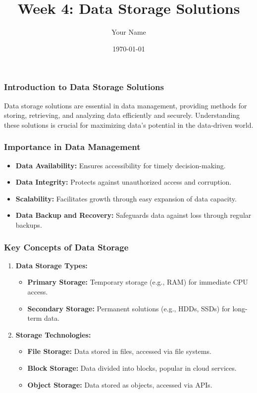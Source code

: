 \documentclass[aspectratio=169]{beamer}
\title[Week 4: Data Storage Solutions]{Week 4: Data Storage Solutions}
\author{Your Name}
\institute{Your Institution}
\date{\today}
\begin{document}
\frame{\titlepage}

\begin{frame}[fragile]
    \frametitle{Introduction to Data Storage Solutions}
    Data storage solutions are essential in data management, providing methods for storing, retrieving, and analyzing data efficiently and securely. Understanding these solutions is crucial for maximizing data's potential in the data-driven world.
\end{frame}

\begin{frame}[fragile]
    \frametitle{Importance in Data Management}
    \begin{itemize}
        \item \textbf{Data Availability:} Ensures accessibility for timely decision-making.
        \item \textbf{Data Integrity:} Protects against unauthorized access and corruption.
        \item \textbf{Scalability:} Facilitates growth through easy expansion of data capacity.
        \item \textbf{Data Backup and Recovery:} Safeguards data against loss through regular backups.
    \end{itemize}
\end{frame}

\begin{frame}[fragile]
    \frametitle{Key Concepts of Data Storage}
    \begin{enumerate}
        \item \textbf{Data Storage Types:}
            \begin{itemize}
                \item \textbf{Primary Storage:} Temporary storage (e.g., RAM) for immediate CPU access.
                \item \textbf{Secondary Storage:} Permanent solutions (e.g., HDDs, SSDs) for long-term data.
            \end{itemize}
        \item \textbf{Storage Technologies:}
            \begin{itemize}
                \item \textbf{File Storage:} Data stored in files, accessed via file systems.
                \item \textbf{Block Storage:} Data divided into blocks, popular in cloud services.
                \item \textbf{Object Storage:} Data stored as objects, accessed via APIs.
            \end{itemize}
    \end{enumerate}
\end{frame}
\end{document}
